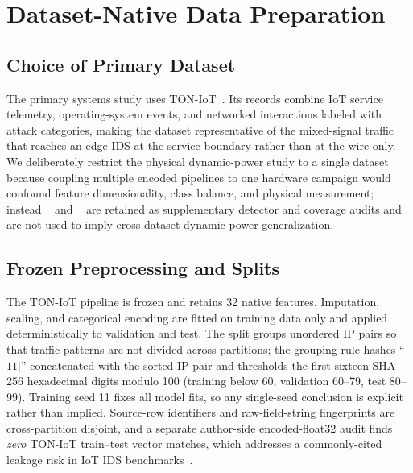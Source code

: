 \section{Dataset-Native Data Preparation}
\label{sec:data}
\subsection{Choice of Primary Dataset}
The primary systems study uses TON-IoT~\cite{TONSource}. Its records combine IoT service telemetry, operating-system events, and networked interactions labeled with attack categories, making the dataset representative of the mixed-signal traffic that reaches an edge IDS at the service boundary rather than at the wire only. We deliberately restrict the physical dynamic-power study to a single dataset because coupling multiple encoded pipelines to one hardware campaign would confound feature dimensionality, class balance, and physical measurement; instead \cic{}~\cite{CICSource} and \nb{}~\cite{NBaIoTSource} are retained as supplementary detector and coverage audits and are not used to imply cross-dataset dynamic-power generalization.

\subsection{Frozen Preprocessing and Splits}
The TON-IoT pipeline is frozen and retains 32 native features. Imputation, scaling, and categorical encoding are fitted on training data only and applied deterministically to validation and test. The split groups unordered IP pairs so that traffic patterns are not divided across partitions; the grouping rule hashes ``$11\vert$'' concatenated with the sorted IP pair and thresholds the first sixteen SHA-256 hexadecimal digits modulo 100 (training below 60, validation 60--79, test 80--99). Training seed 11 fixes all model fits, so any single-seed conclusion is explicit rather than implied. Source-row identifiers and raw-field-string fingerprints are cross-partition disjoint, and a separate author-side encoded-float32 audit finds \emph{zero} TON-IoT train--test vector matches, which addresses a commonly-cited leakage risk in IoT IDS benchmarks~\cite{Arp2022}.

